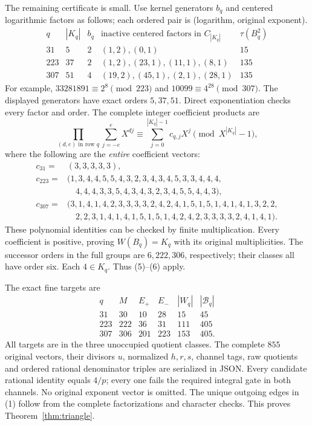 The remaining certificate is small. Use kernel generators $b_q$ and centered
logarithmic factors as follows; each ordered pair is (logarithm, original exponent).
\[
\begin{array}{c|r|r|l|r}
q&|K_q|&b_q&\text{inactive centered factors in }C_{|K_q|}&\tau(B_q^2)\\\hline
31&5&2&(1,2),(0,1)&15\\
223&37&2&(1,2),(23,1),(11,1),(8,1)&135\\
307&51&4&(19,2),(45,1),(2,1),(28,1)&135
\end{array}                                                  \tag{9}
\]
For example, $33281891\equiv2^8\pmod{223}$ and $10099\equiv4^{28}\pmod{307}$.
The displayed generators have exact orders $5,37,51$. Direct exponentiation
checks every factor and order. The complete integer coefficient products are
\[
 \prod_{(d,e)\text{ in row }q}\sum_{j=-e}^{e}X^{dj}
 \equiv\sum_{j=0}^{|K_q|-1}c_{q,j}X^j\pmod{X^{|K_q|}-1},       \tag{10}
\]
where the following are the \emph{entire} coefficient vectors:
\begingroup\small
\begin{align*}
c_{31}={}&(3,3,3,3,3),\\
c_{223}={}&(1,3,4,4,5,5,4,3,2,3,4,3,4,5,3,3,4,4,4,\\
           &\quad4,4,4,3,3,5,4,3,4,3,2,3,4,5,5,4,4,3),\\
c_{307}={}&(3,1,4,1,4,2,3,3,3,3,2,4,2,4,1,5,1,5,1,4,1,4,1,3,2,2,\\
           &\quad2,2,3,1,4,1,4,1,5,1,5,1,4,2,4,2,3,3,3,3,2,4,1,4,1).
\end{align*}
\endgroup
These polynomial identities can be checked by finite multiplication. Every
coefficient is positive, proving $W(B_q)=K_q$ with its original multiplicities.
The successor orders in the full groups are $6,222,306$, respectively; their
classes all have order six. Each $4\in K_q$. Thus (5)--(6) apply.

The exact fine targets are
\[
\begin{array}{c|rrr|r|r}
q&M&E_+&E_-&|W_q|&|\mathcal B_q|\\\hline
31&30&10&28&15&45\\
223&222&36&31&111&405\\
307&306&201&223&153&405.
\end{array}                                                   \tag{11}
\]
All targets are in the three unoccupied quotient classes. The complete $855$
original vectors, their divisors $u$, normalized $h,r,s$, channel tags, raw
quotients and ordered rational denominator triples are serialized in JSON.
Every candidate rational identity equals $4/p$; every one fails the required
integral gate in both channels. No original exponent vector is omitted.
The unique outgoing edges in (1) follow from the complete factorizations and
character checks. This proves Theorem~\ref{thm:triangle}.

